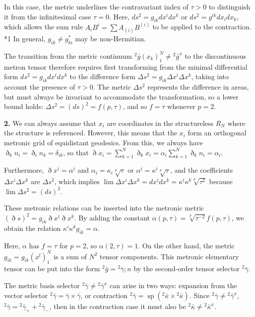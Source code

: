 \documentclass[11pt,a4paper,oneside]{article}
\DeclareMathOperator{\spn}{sp}
\newcommand{\ethop}{\eth}
\begin{document}
In this case, the metric underlines the contravariant index of $\tau > 0$ to distinguish it from the infinitesimal case $\tau = 0$. Here, $ds^2 = g_{ik} dx^idx^k$ or $ds^2 = g^{ik} dx_idx_k$, which allows the sum rule $A_i B^i = \sum A_{(i)} B^{(i)}$ to be applied to the contraction. *1 In general, $g_{ik} \neq g^*_{ki}$ may be non-Hermitian.

The transition from the metric continuum ${}^2 \bar{g}(x_k)^N_1 \neq {}^2 \bar{g}^x$ to the discontinuous metron tensor therefore requires first transforming from the minimal differential form $ds^2 = g_{ik} dx^idx^k$ to the difference form $\Delta s^2 = g_{ik} \Delta x^i \Delta x^k$, taking into account the presence of $\tau > 0$. The metric $\Delta s^2$ represents the difference in areas, but must always be invariant to accommodate the transformation, so a lower bound holds: $\Delta s^2 = (ds)^2 = f(p,\tau)$, and so $f = \tau$ whenever $p = 2$.

\textbf{2.} We can always assume that $x_i$ are coordinates in the structureless $R_N$ where the structure is referenced. However, this means that the $x_i$ form an orthogonal metronic grid of equidistant geodesics.
From this, we always have $\ethop_kn_i=\ethop_in_k= \delta_{ik}$, so that $\ethop x_i= \sum_{k = 1}^N\ethop_kx_i= \alpha_i \sum_{k = 1}^N\ethop_kn_i= \alpha_i$.

Furthermore, $\ethop x^{\underline{i}} = \alpha^{\underline{i}}$ and $\alpha_i = \kappa_i \sqrt [p] {\tau}$ or $\alpha^{\underline {i}} = \kappa^{\underline {i}} \sqrt [p] {\tau}$, and the coefficients $\Delta x^i \Delta x^k$ are $\Delta s^2$, which implies $\lim \Delta x ^i \Delta x^k = dx^{ \underline{i}} dx^{\underline{k}} = \kappa^{\underline{i}} \kappa^{\underline{k}} \sqrt [p] {\tau^2}$ because $\lim \Delta s^2 =(ds)^2$.

These metronic relations can be inserted into the metronic metric $(\ethop s)^2 = g_{ik}\ethop x^{\underline{i}}\ethop x^{\underline{k}}$. By adding the constant $\alpha(p,\tau)= \sqrt [p] {\tau^{-2}} f(p,\tau)$, we obtain the relation $\kappa^i \kappa^k g_{ik} = \alpha$.

Here, $\alpha$ has $f = \tau$ for $p = 2$, so $\alpha(2,\tau)= 1$. On the other hand, the metric $g_{ik} = g_{ik}(x^{\underline{l}})^N_1$ is a sum of $N^2$ tensor components. This metronic elementary tensor can be put into the form ${}^2 \bar{g}={}^2 \bar{\gamma};n$ by the second-order tensor selector ${}^2 \bar{\gamma}$.

The metric basis selector ${}^2 \bar{\gamma} \neq {}^2 \bar{\gamma}^x$ can arise in two ways: expansion from the vector selector ${}^2 \bar{\gamma} = \bar{\gamma} \times \bar{\gamma}$, or contraction ${}^2 \bar{\gamma} = \spn({}^2 \bar{\kappa} \times {}^2 \bar{\kappa})$. Since ${}^2 \bar{\gamma} \neq {}^2 \bar{\gamma}^x$, ${}^2 \bar{\gamma} = {}^2 \bar{ \gamma}_+ + {}^2 \bar{\gamma}_-$, then in the contraction case it must also be ${}^2 \bar{\kappa } \neq {}^2 \bar{\kappa}^x$.
\end{document}
